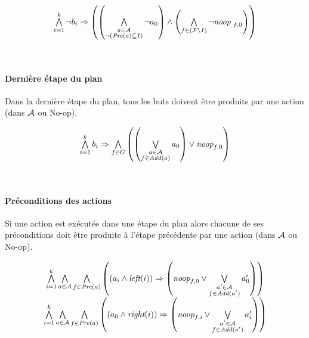\begin{small}
\[
\begin{matrix}
\bigwedge\limits_{\substack{i=1}}^{k} \neg b_{i} \Rightarrow \left( \left(\bigwedge\limits_{\substack{\substack{a \in \mathcal{A}\\\neg \left(\mathit{Pre}(a)\subseteq I\right)}}} \neg a_{0} \right)
\wedge \left(\bigwedge\limits_{\substack{f\in \left(\mathcal{F}\setminus I\right)}}\neg \textit{noop}_{_,f,0}\right)\right)\\
\end{matrix}
\]
\end{small}\\

\paragraph*{Dernière étape du plan}

Dans la dernière étape du plan, tous les buts doivent être produits par une action (dans $\mathcal{A}$ ou No-op).

\begin{small}
\[
\begin{matrix}
\bigwedge\limits_{\substack{i=1}}^{k} b_{i} \Rightarrow \bigwedge\limits_{\substack{f\in G}}\left(\left(\bigvee\limits_{\substack{\substack{a\in\mathcal{A}\\ f \in \mathit{Add}(a)}}} a_{0}\right) \vee \textit{noop}_{f,0}\right)
\end{matrix}
\]
\end{small}\\

\paragraph*{Préconditions des actions}

Si une action est exécutée dans une étape du plan alors chacune de ses préconditions doit être produite à l'étape précédente par une action (dans $\mathcal{A}$ ou No-op).

\begin{small}
\[
\begin{matrix}
\bigwedge\limits_{\substack{i=1}}^{k} \bigwedge\limits_{\substack{a\in\mathcal{A}}} \bigwedge\limits_{\substack{f\in \mathit{Pre}(a)}} \left(\left(a_{i} \wedge \textit{left}(i) \right) \Rightarrow \left(\textit{noop}_{f,0} \vee \bigvee\limits_{\substack{a' \in \mathcal{A} \\ f \in \mathit{Add}(a')}} a'_{0}\right)\right)\\
\bigwedge\limits_{\substack{i=1}}^{k} \bigwedge\limits_{\substack{a\in\mathcal{A}}} \bigwedge\limits_{\substack{f\in \mathit{Pre}(a)}}\left(\left(a_{0} \wedge \textit{right}(i) \right) \Rightarrow \left(\textit{noop}_{f,i} \vee \bigvee\limits_{\substack{a' \in \mathcal{A} \\ f \in \mathit{Add}(a')}} a'_{i}\right)\right)
\end{matrix}
\]
\end{small}\\

